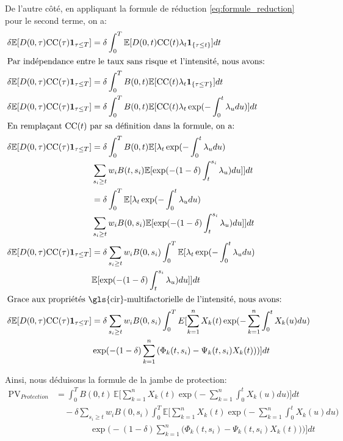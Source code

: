 De l'autre côté, en appliquant la formule de réduction \ref{eq:formule_reduction} pour le second terme, on a:
\begin{align*}
    \delta \mathbb{E}[D(0, \tau) \mathrm{CC}(\tau) \mathbf{1}_{\tau \le T}] &= \delta \int_0^T \mathbb{E}[D(0, t) \mathrm{CC}(t)  \lambda_t \mathbf{1}_{\{\tau \le t\}}] dt \\
    \intertext{Par indépendance entre le taux sans risque et l'intensité, nous avons:}
    \delta \mathbb{E}[D(0, \tau) \mathrm{CC}(\tau) \mathbf{1}_{\tau \le T}] &= \delta \int_0^T B(0, t) \mathbb{E}[\mathrm{CC}(t)\lambda_t\mathbf{1}_{\{\tau \le T\}}]dt \\
    \delta \mathbb{E}[D(0, \tau) \mathrm{CC}(\tau) \mathbf{1}_{\tau \le T}] &= \delta \int_0^T B(0, t) \mathbb{E}[\mathrm{CC}(t)\lambda_t \exp(-\int_0^t \lambda_u du)]dt \\
    \intertext{En remplaçant $\mathrm{CC}(t)$ par sa définition dans la formule, on a:}
    \delta \mathbb{E}[D(0, \tau) \mathrm{CC}(\tau) \mathbf{1}_{\tau \le T}] &= \delta \int_0^T B(0, t) \mathbb{E}[\lambda_t \exp(-\int_0^t \lambda_u du) \\
    & \sum_{s_i \ge t} w_i B(t, s_i) \mathbb{E}[\exp(-(1 - \delta)\int_t^{s_i} \lambda_u)du]]dt \\
    &= \delta \int_0^T \mathbb{E}[\lambda_t \exp(-\int_0^t \lambda_u du) \\
    & \sum_{s_i \ge t} w_i B(0, s_i) \mathbb{E}[\exp(-(1 - \delta)\int_t^{s_i} \lambda_u)du]]dt \\
    \delta \mathbb{E}[D(0, \tau) \mathrm{CC}(\tau) \mathbf{1}_{\tau \le T}] &= \delta \sum_{s_i \ge t} w_i B(0, s_i) \int_0^T \mathbb{E}[\lambda_t \exp(-\int_0^t \lambda_u du) \\
    & \mathbb{E}[\exp(-(1 - \delta)\int_t^{s_i} \lambda_u)du]]dt \\
    \intertext{Grace aux propriétés \gls{cir}-multifactorielle de l'intensité, nous avons:}
    \delta \mathbb{E}[D(0, \tau) \mathrm{CC}(\tau) \mathbf{1}_{\tau \le T}] &= \delta \sum_{s_i \ge t} w_i B(0, s_i) \int_0^T \mathbb{}{E}[\sum_{k = 1}^n X_k(t) \exp(-\sum_{k = 1}^n \int_0^t X_k(u) du) \\
    & \exp(-(1 - \delta) \sum_{k = 1}^n \left( \Phi_k(t, s_i) - \Psi_k(t, s_i) X_k(t) \right))]dt
\end{align*}

Ainsi, nous déduisons la formule de la jambe de protection:
\begin{equation}
    \begin{split}
        \mathrm{PV}_{Protection} &= \int_0^T B(0, t) \, \mathbb{E}\Bigg[\sum_{k=1}^n X_k(t) \exp\Bigg(-\sum_{k = 1}^n \int_0^t X_k(u) du\Bigg)\Bigg] dt \\
        &\quad - \delta \sum_{s_i \ge t} w_i B(0, s_i) \int_0^T \mathbb{E}\Bigg[\sum_{k = 1}^n X_k(t) \exp\Bigg(-\sum_{k = 1}^n \int_0^t X_k(u) du\Bigg) \\
        &\qquad\qquad \exp\Bigg(-(1 - \delta) \sum_{k = 1}^n \Big( \Phi_k(t, s_i) - \Psi_k(t, s_i) X_k(t) \Big)\Bigg)\Bigg] dt
    \end{split}
\label{eq:jambe_protection}
\end{equation}


